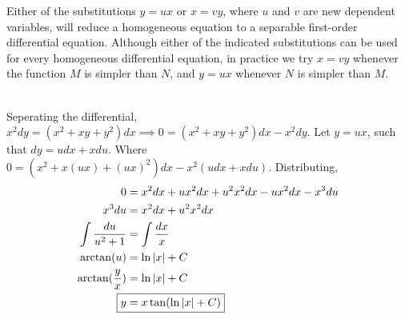 \documentclass{article}
\begin{document}
\noindent
Either of the substitutions $y=u x$ or $x=v y$, where $u$ and $v$ are new dependent variables, will reduce a homogeneous equation to a separable first-order differential equation.
\double
Although either of the indicated substitutions can be used for every homogeneous differential equation, in practice we try $x=v y$ whenever the function $M$ is simpler than $N$, and $y=u x$ whenever $N$ is simpler than $M$.


\sol \\
Seperating the differential, $x^2 dy = (x^2+xy+y^2)dx \implies 0 = (x^2 + xy+ y^2) dx - x^2 dy$.
Let $y=ux$, such that $dy = udx + xdu$. Where $0 = (x^2 + x(ux) + (ux)^2)dx - x^2(udx + xdu)$.
Distributing,
\begin{align*}
0 &= x^2 dx + ux^2 dx + u^2x^2 dx - ux^2dx - x^3 du \\
x^3 du &= x^2 dx + u^2x^2 dx \\
\int \frac{du}{u^2+1} &= \int \frac{dx}{x} \\
\arctan(u) &= \ln|x| + C \\
\arctan(\frac{y}{x}) &= \ln|x| + C \\
\Aboxed{y &= x\tan(\ln|x|+C)}
\end{align*}
\end{document}
